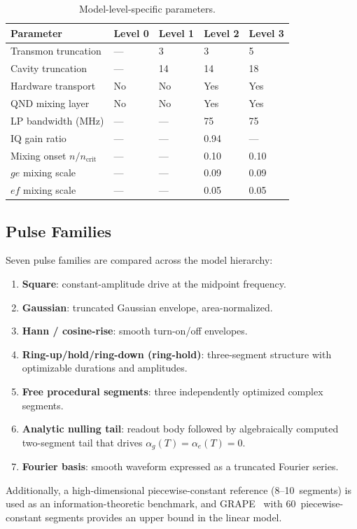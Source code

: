 \documentclass[aps,pra,twocolumn,reprint,amsmath,amssymb]{revtex4-2}
\begin{document}
\begin{table}[tp]
\centering
\caption{Model-level-specific parameters.}
\begin{tabular}{@{} l l l l l @{}}
\toprule
Parameter & Level 0 & Level 1 & Level 2 & Level 3 \\
\midrule
Transmon truncation & --- & 3 & 3 & 5 \\
Cavity truncation & --- & 14 & 14 & 18 \\
Hardware transport & No & No & Yes & Yes \\
QND mixing layer & No & No & Yes & Yes \\
LP bandwidth (MHz) & --- & --- & 75 & 75 \\
IQ gain ratio & --- & --- & 0.94 & --- \\
Mixing onset $n/n_\mathrm{crit}$ & --- & --- & 0.10 & 0.10 \\
$ge$ mixing scale & --- & --- & 0.09 & 0.09 \\
$ef$ mixing scale & --- & --- & 0.05 & 0.05 \\
\bottomrule
\end{tabular}
\label{tab:model_levels}
\end{table}

\subsection{Pulse Families}

Seven pulse families are compared across the model hierarchy:
\begin{enumerate}
\item \textbf{Square}: constant-amplitude drive at the midpoint frequency.
\item \textbf{Gaussian}: truncated Gaussian envelope, area-normalized.
\item \textbf{Hann / cosine-rise}: smooth turn-on/off envelopes.
\item \textbf{Ring-up/hold/ring-down (ring-hold)}: three-segment structure with optimizable durations and amplitudes.
\item \textbf{Free procedural segments}: three independently optimized complex segments.
\item \textbf{Analytic nulling tail}: readout body followed by algebraically computed two-segment tail that drives $\alpha_g(T)=\alpha_e(T)=0$.
\item \textbf{Fourier basis}: smooth waveform expressed as a truncated Fourier series.
\end{enumerate}
Additionally, a high-dimensional piecewise-constant reference (8--10~segments) is used as an information-theoretic benchmark, and GRAPE~\cite{khaneja2005optimal} with 60~piecewise-constant segments provides an upper bound in the linear model.
\end{document}
